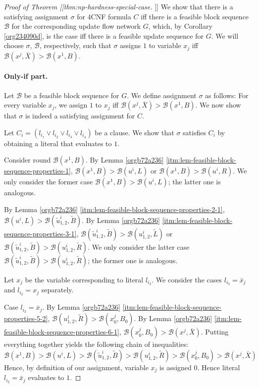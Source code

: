 \documentclass[fontsize=11pt,paper=a4]{book}
\begin{document}
\begin{proof}[Proof of Theorem [[thm:np-hardness-special-case]]]
We show that there is a satisfying assignment \(\sigma\) for 4CNF formula \(C\) iff there is a feasible block sequence \(\mathcal{B}\) for the corresponding update flow network \(G\), which, by Corollary \ref{org234090d}, is the case iff there is a feasible update sequence for \(G\).
We will choose \(\sigma\), \(\mathcal{B}\), respectively, such that \(\sigma\) assigns \(1\) to variable \(x_j\) iff \(\mathcal{B}(x^j,\bar{X})>\mathcal{B}(x^1,B)\).

\paragraph{Only-if part.}
Let \(\mathcal{B}\) be a feasible block sequence for \(G\).
We define assignment \(\sigma\) as follows:
For every variable \(x_j\), we assign \(1\) to \(x_j\) iff \(\mathcal{B}(x^j,\bar{X})>\mathcal{B}(x^1,B)\).
We now show that \(\sigma\) is indeed a satisfying assignment for \(C\).

Let \(C_i=(l_{i_1}\vee l_{i_2}\vee l_{i_3}\vee l_{i_4})\) be a clause.
We show that \(\sigma\) satisfies \(C_i\) by obtaining a literal that evaluates to \(1\).

Consider round \(\mathcal{B}(x^1,B)\).
By Lemma \ref{orgb72a236} \ref{itm:lem-feasible-block-sequence-properties-1}, \(\mathcal{B}(x^1,B)>\mathcal{B}(u^i,L)\) or \(\mathcal{B}(x^1,B)>\mathcal{B}(u^i,R)\).
We only consider the former case \(\mathcal{B}(x^1,B)>\mathcal{B}(u^i,L)\); the latter one is analogous.

By Lemma \ref{orgb72a236} \ref{itm:lem-feasible-block-sequence-properties-2-1}, \(\mathcal{B}(u^i,L)>\mathcal{B}(\tilde{u}_{1,2}^i,\tilde{B})\).
By Lemma \ref{orgb72a236} \ref{itm:lem-feasible-block-sequence-properties-3-1}, \(\mathcal{B}(\tilde{u}_{1,2}^i,\tilde{B})>\mathcal{B}(u_{1,2}^i,\tilde{L})\) or \(\mathcal{B}(\tilde{u}_{1,2}^i,\tilde{B})>\mathcal{B}(u_{1,2}^i,\tilde{R})\).
We only consider the latter case \(\mathcal{B}(\tilde{u}_{1,2}^i,\tilde{B})>\mathcal{B}(u_{1,2}^i,\tilde{R})\); the former one is analogous.

Let \(x_j\) be the variable corresponding to literal \(l_{i_2}\).
We consider the cases \(l_{i_2}=\bar{x}_j\) and \(l_{i_2}=x_j\) separately.

Case \(l_{i_2}=\bar{x}_j\).
By Lemma \ref{orgb72a236} \ref{itm:lem-feasible-block-sequence-properties-5-2}, \(\mathcal{B}(u_{1,2}^i,\tilde{R})>\mathcal{B}(x_0^j,B_0)\).
By Lemma \ref{orgb72a236} \ref{itm:lem-feasible-block-sequence-properties-6-1}, \(\mathcal{B}(x_0^j,B_0)>\mathcal{B}(x^j,\bar{X})\).
Putting everything together yields the following chain of inequalities:
\[
\mathcal{B}(x^1,B)>
\mathcal{B}(u^i,L)>
\mathcal{B}(\tilde{u}_{1,2}^i,\tilde{B})>
\mathcal{B}(u_{1,2}^i,\tilde{R})>
\mathcal{B}(x_0^j,B_0)>
\mathcal{B}(x^j,\bar{X})
\]
Hence, by definition of our assignment, variable \(x_j\) is assigned \(0\).
Hence literal \(l_{i_2}=\bar{x}_j\) evaluates to \(1\).


\end{proof}
\end{document}
